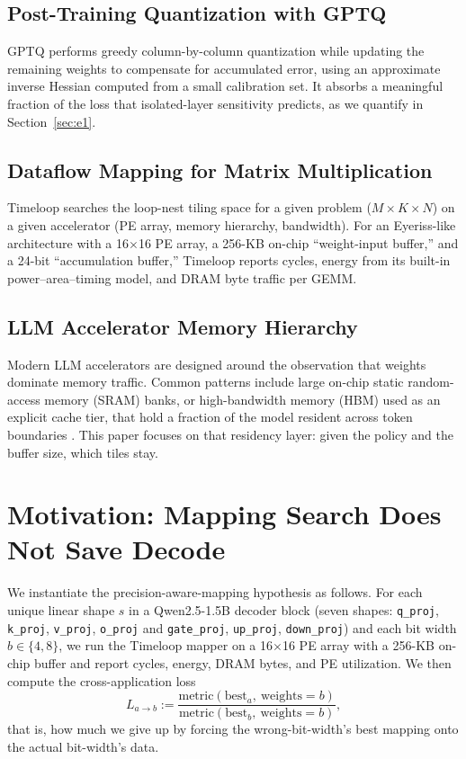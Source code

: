 \documentclass{ieeeaccess}
\begin{document}
\subsection{Post-Training Quantization with GPTQ}
GPTQ \cite{frantar2023gptq} performs greedy column-by-column
quantization while updating the remaining weights to compensate for
accumulated error, using an approximate inverse Hessian computed from a
small calibration set. It absorbs a meaningful fraction of the loss
that isolated-layer sensitivity predicts, as we quantify in
Section~\ref{sec:e1}.

\subsection{Dataflow Mapping for Matrix Multiplication}
Timeloop \cite{parashar2019timeloop} searches the loop-nest tiling
space for a given problem ($M\!\times\!K\!\times\!N$) on a given
accelerator (PE array, memory hierarchy, bandwidth). For an
Eyeriss-like architecture \cite{chen2017eyeriss} with a 16$\times$16 PE
array, a 256-KB on-chip ``weight-input buffer,'' and a 24-bit
``accumulation buffer,'' Timeloop reports cycles, energy from its
built-in power--area--timing model, and DRAM byte traffic per GEMM.

\subsection{LLM Accelerator Memory Hierarchy}
Modern LLM accelerators are designed around the observation that
weights dominate memory traffic. Common patterns include large on-chip
static random-access memory (SRAM) banks, or high-bandwidth memory
(HBM) used as an explicit cache tier, that hold a fraction of the model
resident across token boundaries
\cite{lu2021sanger, guo2022ant}. This paper focuses on that residency
layer: given the policy and the buffer size, which tiles stay.

\section{Motivation: Mapping Search Does Not Save Decode}
\label{sec:motivation}

We instantiate the precision-aware-mapping hypothesis as follows. For
each unique linear shape $s$ in a Qwen2.5-1.5B decoder block (seven
shapes: \texttt{q\_proj}, \texttt{k\_proj}, \texttt{v\_proj},
\texttt{o\_proj} and \texttt{gate\_proj}, \texttt{up\_proj},
\texttt{down\_proj}) and each bit width $b \in \{4, 8\}$, we run the
Timeloop mapper on a 16$\times$16 PE array with a 256-KB on-chip
buffer and report cycles, energy, DRAM bytes, and PE utilization. We
then compute the cross-application loss
\begin{equation}
L_{a \to b} := \frac{\mathrm{metric}(\mathrm{best}_a,\ \mathrm{weights}\!=\!b)}{\mathrm{metric}(\mathrm{best}_b,\ \mathrm{weights}\!=\!b)},
\label{eq:cross_app}
\end{equation}
that is, how much we give up by forcing the wrong-bit-width's best
mapping onto the actual bit-width's data.
\end{document}
